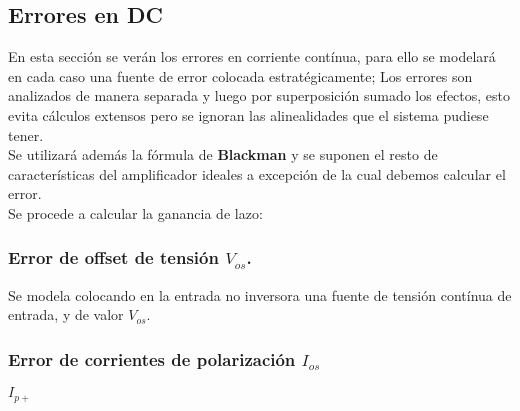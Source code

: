 \begin{center}
\end{center}

\subsection{Errores en DC}
En esta sección se verán los errores en corriente contínua, para ello se modelará en cada caso una fuente de error colocada estratégicamente; Los errores son analizados de manera separada y luego por superposición sumado los efectos, esto evita cálculos extensos pero se ignoran las alinealidades que el sistema pudiese tener.\\

Se utilizará además la fórmula de \textbf{Blackman} y se suponen el resto de características del amplificador ideales a excepción de la cual debemos calcular el error.\\

Se procede a calcular la ganancia de lazo:\\

\begin{center}
\end{center}

\subsubsection{Error de offset de tensión $V_{os}$.}
Se modela colocando en la entrada no inversora una fuente de tensión contínua de entrada, y de valor $V_{os}$.\\

\begin{center}
\end{center}

\begin{center}
\end{center}
\newpage
\subsubsection{Error de corrientes de polarización $I_{os}$}

\begin{center}
    \textbf{$I_{p+}$}\\
\end{center}


